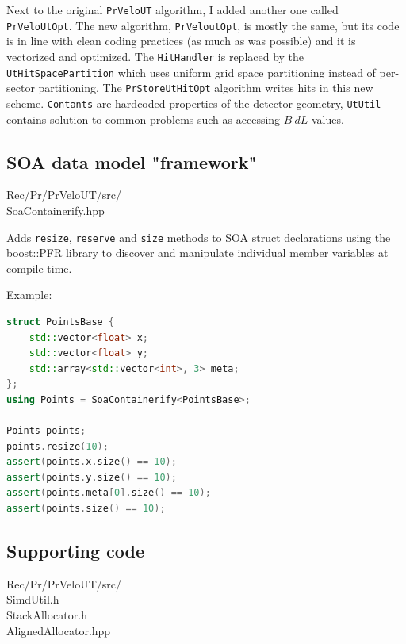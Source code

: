 \documentclass[12pt]{article}
\newcommand\tab[1][.7cm]{\hspace*{#1}}
\newcommand{\code}[1]{\texttt{#1}}
\begin{document}
Next to the original \code{PrVeloUT} algorithm, I added another one called \code{PrVeloUtOpt}. The new algorithm, \code{PrVeloutOpt}, is mostly the same, but its code is in line with clean coding practices (as much as was possible) and it is vectorized and optimized. The \code{HitHandler} is replaced by the \code{UtHitSpacePartition} which uses uniform grid space partitioning instead of per-sector partitioning. The \code{PrStoreUtHitOpt} algorithm writes hits in this new scheme. \code{Contants} are hardcoded properties of the detector geometry, \code{UtUtil} contains solution to common problems such as accessing $B\ dL$ values.

\newpage
\subsection{SOA data model "framework"}

\begin{itshape}
    Rec/Pr/PrVeloUT/src/\\
    \tab SoaContainerify.hpp
\end{itshape}

\vspace{1pc}

Adds \code{resize}, \code{reserve} and \code{size} methods to SOA struct declarations using the boost::PFR library to discover and manipulate individual member variables at compile time.

Example:
\begin{lstlisting}[language=C++]
struct PointsBase {
    std::vector<float> x;
    std::vector<float> y;
    std::array<std::vector<int>, 3> meta;
};
using Points = SoaContainerify<PointsBase>;

Points points;
points.resize(10);
assert(points.x.size() == 10);
assert(points.y.size() == 10);
assert(points.meta[0].size() == 10);
assert(points.size() == 10);
\end{lstlisting}


\subsection{Supporting code}

\begin{itshape}
    Rec/Pr/PrVeloUT/src/\\
    \tab SimdUtil.h\\
    \tab StackAllocator.h\\
    \tab AlignedAllocator.hpp
\end{itshape}
\end{document}
